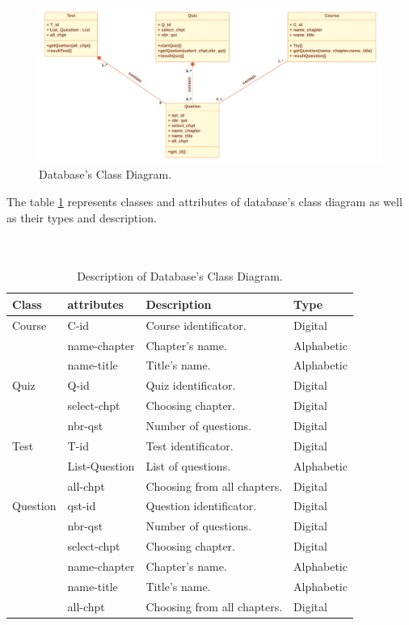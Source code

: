 \begin{figure}[ht]
	\centering
	\label{}\includegraphics[scale=0.45]{img/BDD class.pdf}                
	\caption{Database's Class Diagram.} 
	\label{fig:BDD DC}
\end{figure} 



The table \ref{tab:BDD DC} represents classes and attributes of database's class diagram as well as their types and description.\\\\\\
\newpage
\begin{table}[h!]
	\begin{center}
		\begin{tabular}{ |p{3cm}|p{3cm}|p{4cm}|p{2cm}|  }
 		\hline
 		Class & attributes & Description & Type \\
 		\hline \hline
 		Course & C-id & Course identificator. & Digital  \\
			& name-chapter & Chapter's name. & Alphabetic \\
			& name-title & Title's name. & Alphabetic \\
		\hline
		Quiz & Q-id & Quiz identificator. & Digital  \\
			& select-chpt & Choosing chapter. & Digital \\
			& nbr-qst & Number of questions. & Digital \\
		\hline
		Test & T-id & Test identificator. & Digital  \\
			& List-Question & List of questions. & Alphabetic \\
			& all-chpt & Choosing from all chapters. & Digital \\
		\hline
		Question & qst-id & Question identificator. & Digital  \\
			& nbr-qst & Number of questions. & Digital \\
			& select-chpt & Choosing chapter. & Digital \\
			& name-chapter & Chapter's name. & Alphabetic \\
			& name-title & Title's name. & Alphabetic \\
			& all-chpt & Choosing from all chapters. & Digital \\
		\hline
\end{tabular}
\end{center}
\caption{Description of Database's Class Diagram.}
\label{tab:BDD DC}
\end{table}


